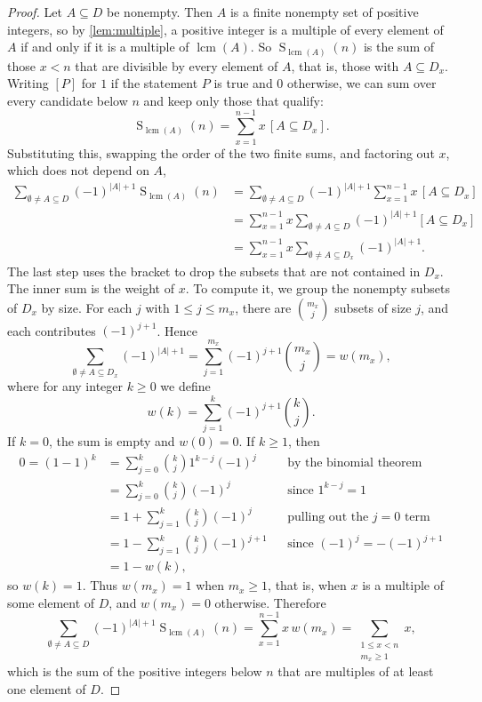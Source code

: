 \documentclass{article}
\begin{document}
\begin{proof}
  Let $A \subseteq D$ be nonempty. Then $A$ is a finite nonempty set of positive integers, so by \cref{lem:multiple},
  a positive integer is a multiple of every element of $A$ if and only if it is a multiple of
  $\operatorname{lcm}(A)$. So $\operatorname{S}_{\operatorname{lcm}(A)}(n)$ is the sum of those $x < n$
  that are divisible by every element of $A$, that is, those with $A \subseteq D_x$. Writing $[P]$ for $1$ if the
  statement $P$ is true and $0$ otherwise, we can sum over every candidate below $n$ and keep only those that qualify:
  \[
    \operatorname{S}_{\operatorname{lcm}(A)}(n) = \sum_{x=1}^{n-1} x \, [A \subseteq D_x].
  \]
  Substituting this, swapping the order of the two finite sums, and factoring out $x$, which does not depend on $A$,
  \begin{align*}
    \sum_{\emptyset \ne A \subseteq D} {(-1)}^{|A|+1} \operatorname{S}_{\operatorname{lcm}(A)}(n)
      &= \sum_{\emptyset \ne A \subseteq D} {(-1)}^{|A|+1} \sum_{x=1}^{n-1} x \, [A \subseteq D_x] \\
      &= \sum_{x=1}^{n-1} x \sum_{\emptyset \ne A \subseteq D} {(-1)}^{|A|+1} [A \subseteq D_x] \\
      &= \sum_{x=1}^{n-1} x \sum_{\emptyset \ne A \subseteq D_x} {(-1)}^{|A|+1}.
  \end{align*}
  The last step uses the bracket to drop the subsets that are not contained in $D_x$.
  The inner sum is the weight of $x$. To compute it, we group the nonempty subsets of $D_x$ by size. For each $j$ with
  $1 \le j \le m_x$, there are $\binom{m_x}{j}$ subsets of size $j$, and each contributes ${(-1)}^{j+1}$. Hence
  \[
    \sum_{\emptyset \ne A \subseteq D_x} {(-1)}^{|A|+1} = \sum_{j=1}^{m_x} {(-1)}^{j+1} \binom{m_x}{j} = w(m_x),
  \]
  where for any integer $k \ge 0$ we define
  \[
    w(k) = \sum_{j=1}^{k} {(-1)}^{j+1} \binom{k}{j}.
  \]
  If $k = 0$, the sum is empty and $w(0) = 0$. If $k \ge 1$, then
  \begin{align*}
    0 = {(1 - 1)}^k
      &= \sum_{j=0}^{k} \binom{k}{j} 1^{k-j} {(-1)}^{j} && \text{by the binomial theorem} \\
      &= \sum_{j=0}^{k} \binom{k}{j} {(-1)}^{j} && \text{since $1^{k-j} = 1$} \\
      &= 1 + \sum_{j=1}^{k} \binom{k}{j} {(-1)}^{j} && \text{pulling out the $j = 0$ term} \\
      &= 1 - \sum_{j=1}^{k} \binom{k}{j} {(-1)}^{j+1} && \text{since ${(-1)}^{j} = -{(-1)}^{j+1}$} \\
      &= 1 - w(k),
  \end{align*}
  so $w(k) = 1$. Thus $w(m_x) = 1$ when $m_x \ge 1$, that is, when $x$ is a multiple of some element of $D$, and
  $w(m_x) = 0$ otherwise. Therefore
  \[
    \sum_{\emptyset \ne A \subseteq D} {(-1)}^{|A|+1} \operatorname{S}_{\operatorname{lcm}(A)}(n)
      = \sum_{x=1}^{n-1} x \, w(m_x)
      = \sum_{\substack{1 \le x < n \\ m_x \ge 1}} x,
  \]
  which is the sum of the positive integers below $n$ that are multiples of at least one element of $D$.
\end{proof}
\end{document}
